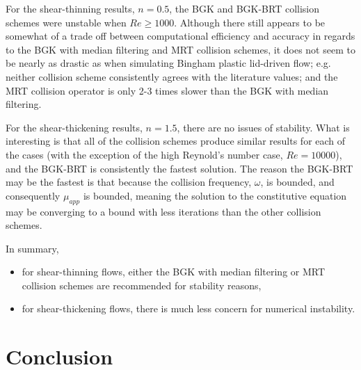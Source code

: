 \documentclass{article}
\begin{document}
For the shear-thinning results, $n = 0.5$, the BGK and BGK-BRT collision schemes were unstable when $Re \ge 1000$.
Although there still appears to be somewhat of a trade off between computational efficiency and accuracy in regards to the BGK with median filtering and MRT collision schemes, it does not seem to be nearly as drastic as when simulating Bingham plastic lid-driven flow; e.g. neither collision scheme consistently agrees with the literature values; and the MRT collision operator is only 2-3 times slower than the BGK with median filtering.

For the shear-thickening results, $n = 1.5$, there are no issues of stability.
What is interesting is that all of the collision schemes produce similar results for each of the cases (with the exception of the high Reynold's number case, $Re = 10000$), and the BGK-BRT is consistently the fastest solution.
The reason the BGK-BRT may be the fastest is that because the collision frequency, $\omega$, is bounded, and consequently $\mu_{app}$ is bounded, meaning the solution to the constitutive equation may be converging to a bound with less iterations than the other collision schemes.

In summary, 
\begin{itemize}
    \item for shear-thinning flows, either the BGK with median filtering or MRT collision schemes are recommended for stability reasons,
    \item for shear-thickening flows, there is much less concern for numerical instability.
\end{itemize}

\section{Conclusion}
\end{document}
